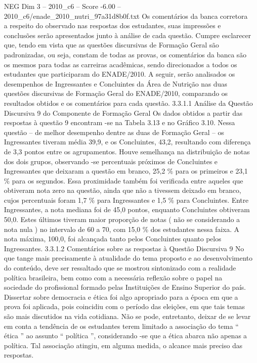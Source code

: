 \begin{textsample}{NEG Dim 3 – 2010\_c6 – Score -6.00 – 2010\_c6/enade\_2010\_nutri\_97a31d8b0f.txt}
Os comentários da banca corretora a respeito do observado nas respostas dos estudantes, suas impressões e conclusões serão apresentados junto à análise de cada questão.
Cumpre esclarecer que, tendo em vista que as questões discursivas de Formação Geral são padronizadas, ou seja, constam de todas as provas, os comentários da banca são os mesmos para todas as carreiras acadêmicas, sendo direcionados a todos os estudantes que participaram do ENADE/2010.
A seguir, serão analisados os desempenhos de Ingressantes e Concluintes da Área de Nutrição nas duas questões discursivas de Formação Geral do ENADE/2010, comparando os resultados obtidos e os comentários para cada questão. 3.3.1.1 Análise da Questão Discursiva 9 do Componente de Formação Geral Os dados obtidos a partir das respostas à questão 9 encontram -se na Tabela 3.13 e no Gráfico 3.10.
Nessa questão – de melhor desempenho dentre as duas de Formação Geral – os Ingressantes tiveram média 39,9, e os Concluintes, 43,2, resultando com diferença de 3,3 pontos entre os agrupamentos.
Houve semelhança na distribuição de notas dos dois grupos, observando -se percentuais próximos de Concluintes e Ingressantes que deixaram a questão em branco, 25,2 \% para os primeiros e 23,1 \% para os segundos.
Essa proximidade também foi verificada entre aqueles que obtiveram nota zero na questão, ainda que não a tivessem deixado em branco, cujos percentuais foram 1,7 \% para Ingressantes e 1,5 \% para Concluintes.
Entre Ingressantes, a nota mediana foi de 45,0 pontos, enquanto Concluintes obtiveram 50,0.
Estes últimos tiveram maior proporção de notas ( não se considerando a nota nula ) no intervalo de 60 a 70, com 15,0 \% dos estudantes nessa faixa.
A nota máxima, 100,0, foi alcançada tanto pelos Concluintes quanto pelos Ingressantes. 3.3.1.2 Comentários sobre as respostas à Questão Discursiva 9 No que tange mais precisamente à atualidade do tema proposto e ao desenvolvimento do conteúdo, deve ser ressaltado que se mostrou sintonizado com a realidade política brasileira, bem como com a necessária reflexão sobre o papel na sociedade do profissional formado pelas Instituições de Ensino Superior do país.
Dissertar sobre democracia e ética foi algo apropriado para a época em que a prova foi aplicada, pois coincidiu com o período das eleições, em que tais temas são mais discutidos na vida cotidiana.
Não se pode, entretanto, deixar de se levar em conta a tendência de os estudantes terem limitado a associação do tema “ ética ” ao assunto “ política ”, considerando -se que a ética abarca não apenas a política.
Tal associação atingiu, em alguma medida, o alcance mais preciso das respostas.

\end{textsample}
